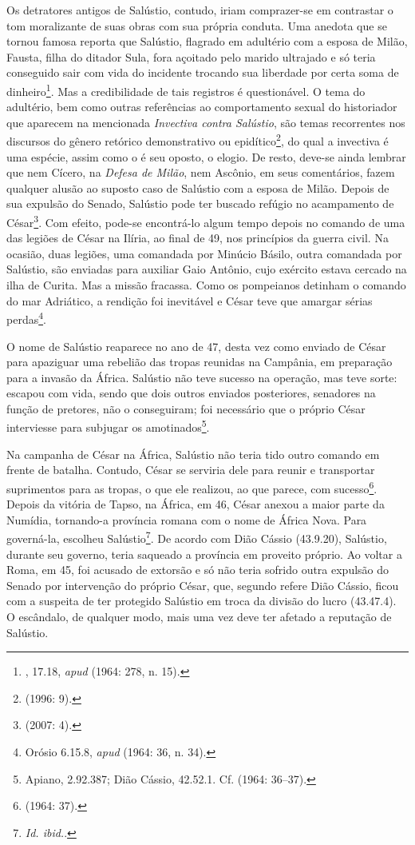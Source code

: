 Os detratores antigos de Salústio, contudo, iriam comprazer-se em contrastar o
tom moralizante de suas obras com sua própria conduta. Uma anedota que se
tornou famosa reporta que Salústio, flagrado em adultério com a esposa de
Milão, Fausta, filha do ditador Sula, fora açoitado pelo marido ultrajado e só
teria conseguido sair com vida do incidente trocando sua liberdade por certa
soma de dinheiro\footnote{  ,  17.18, \emph{apud}  (1964: 
278, n. 15).}.  Mas a credibilidade de tais registros é questionável. O tema do
adultério, bem como outras referências ao comportamento sexual do historiador
que aparecem na mencionada \emph{Invectiva contra Salústio}, são temas
recorrentes nos discursos do gênero retórico demonstrativo ou
epidítico\footnote{ (1996: 9).}, do qual a invectiva é uma espécie,
assim como o é seu oposto, o elogio. De resto, deve-se ainda lembrar que nem
Cícero, na \emph{Defesa de Milão}, nem Ascônio, em seus comentários, fazem
qualquer alusão ao suposto caso de Salústio com a esposa de Milão.  Depois de
sua expulsão do Senado, Salústio pode ter buscado refúgio no acampamento de
César\footnote{ (2007: 4).}. Com efeito, pode-se encontrá-lo algum
tempo depois no comando de uma das legiões de César na Ilíria, ao final de 49,
nos princípios da guerra civil. Na ocasião, duas legiões, uma comandada por
Minúcio Básilo, outra comandada por Salústio, são enviadas para auxiliar Gaio
Antônio, cujo exército estava cercado na ilha de Curita. Mas a missão fracassa.
Como os pompeianos detinham o comando do mar Adriático, a rendição foi
inevitável e César teve que amargar sérias perdas\footnote{Orósio 6.15.8,
\emph{apud}  (1964: 36, n. 34).}.

O nome de Salústio reaparece no ano de 47, desta vez como enviado de César para
apaziguar uma rebelião das tropas reunidas na Campânia, em preparação para a
invasão da África. Salústio não teve sucesso na operação, mas teve sorte:
escapou com vida, sendo que dois outros enviados posteriores, senadores na função de pretores, não o conseguiram; foi necessário que o próprio César
interviesse para subjugar os amotinados\footnote{Apiano, \emph{} 2.92.387; Dião Cássio, 42.52.1. Cf.  (1964: 36--37).}. 

Na campanha de César na África, Salústio não teria tido outro comando em frente
de batalha. Contudo, César se serviria dele para reunir e transportar
suprimentos para as tropas, o que ele realizou, ao que parece, com
sucesso\footnote{ (1964: 37).}. Depois da vitória de Tapso, na África,
em 46, César anexou a maior parte da Numídia, tornando-a província romana com o
nome de África Nova. Para governá-la, escolheu Salústio\footnote{\emph{ Id.
ibid.}.}. De acordo com Dião Cássio (43.9.20),  Salústio, durante seu
governo, teria saqueado a província em proveito próprio. Ao voltar a Roma, em
45, foi acusado de extorsão e só não teria sofrido outra expulsão do Senado por
intervenção do próprio César, que, segundo refere Dião Cássio, ficou com a
suspeita de ter protegido Salústio em troca da divisão do lucro (43.47.4). O
escândalo, de qualquer modo, mais uma vez deve ter afetado a reputação de
Salústio.

